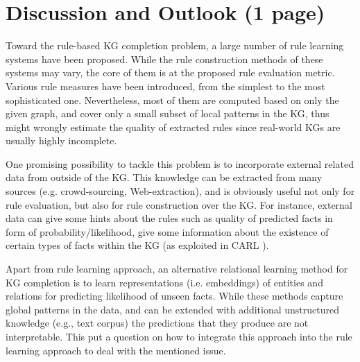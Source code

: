 \section{Discussion and Outlook (1 page)}
\label{sec:discussion_outlook}
Toward the rule-based KG completion problem, a large number of rule learning systems have been proposed. While the rule construction methods of these systems may vary, the core of them is at the proposed rule evaluation metric. Various rule measures have been introduced, from the simplest to the most sophisticated one. Nevertheless, most of them are computed based on only the given graph, and cover only a small subset of local patterns in the KG, thus might wrongly estimate the quality of extracted rules since real-world KGs are usually highly incomplete.

One promising possibility to tackle this problem is to incorporate external related data from outside of the KG. This knowledge can be extracted from many sources (e.g. crowd-sourcing, Web-extraction), and is obviously useful not only for rule evaluation, but also for rule construction over the KG. For instance, external data can give some hints about the rules such as quality of predicted facts in form of probability/likelihood, give some information about the existence of certain types of facts within the KG (as exploited in CARL \cite{carl}).

Apart from rule learning approach, an alternative relational learning method for KG completion is to
learn representations (i.e. embeddings) of entities and relations for predicting likelihood of unseen facts. 
While these methods capture global patterns in the data, and can be extended with additional unstructured knowledge (e.g., text corpus) the predictions that they produce are not interpretable. This put a question on how to integrate this approach into the rule learning approach to deal with the mentioned issue.




